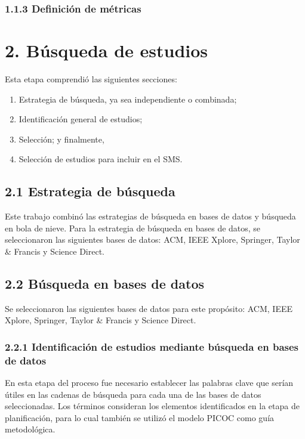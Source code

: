 \subsubsection*{1.1.3 Definición de métricas}
\label{subsubsec:metricasSMS}



\section*{2. Búsqueda de estudios}
\label{sec:busquedaEstudios}

Esta etapa comprendió las siguientes secciones: 
\begin{enumerate}
  \item Estrategia de búsqueda, ya sea independiente o combinada;
  \item Identificación general de estudios;
  \item Selección; y finalmente,
  \item Selección de estudios para incluir en el SMS.\end{enumerate}

\subsection*{2.1 Estrategia de búsqueda}
\label{subsec:estrategiaBusqueda}

Este trabajo combinó las estrategias de búsqueda en bases de datos y búsqueda en bola de nieve. 
Para la estrategia de búsqueda en bases de datos, se seleccionaron las siguientes bases de datos: ACM, IEEE Xplore, Springer, Taylor \& Francis y Science Direct.

\subsection*{2.2 Búsqueda en bases de datos}
\label{subsec:busquedaBasesDatos}
Se seleccionaron las siguientes bases de datos para este propósito: ACM, IEEE Xplore, Springer, Taylor \& Francis y Science Direct.

\subsubsection*{2.2.1 Identificación de estudios mediante búsqueda en bases de datos}
\label{subsubsec:identificacionEstudios}
En esta etapa del proceso fue necesario establecer las palabras clave que serían útiles en las cadenas de búsqueda para cada una de las bases de datos seleccionadas. 
Los términos consideran los elementos identificados en la etapa de planificación, para lo cual también se utilizó el modelo PICOC como guía metodológica.

